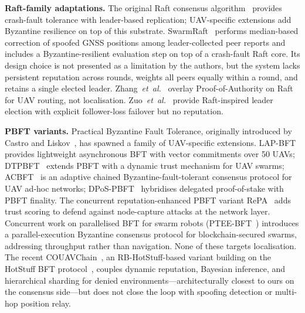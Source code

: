 \documentclass[conference,10pt]{IEEEtran}
\begin{document}
\textbf{Raft-family adaptations.} The original Raft consensus algorithm~\cite{ongaro2014raft} provides crash-fault tolerance with leader-based replication; UAV-specific extensions add Byzantine resilience on top of this substrate. SwarmRaft~\cite{dev2025swarmraft} performs median-based correction of spoofed GNSS positions among leader-collected peer reports and includes a Byzantine-resilient evaluation step on top of a crash-fault Raft core. Its design choice is not presented as a limitation by the authors, but the system lacks persistent reputation across rounds, weights all peers equally within a round, and retains a single elected leader. Zhang~\emph{et~al.}~\cite{zhang2024reputation} overlay Proof-of-Authority on Raft for UAV routing, not localisation. Zuo~\emph{et~al.}~\cite{zuo2022voting} provide Raft-inspired leader election with explicit follower-loss failover but no reputation.

\textbf{PBFT variants.} Practical Byzantine Fault Tolerance, originally introduced by Castro and Liskov~\cite{castro1999pbft}, has spawned a family of UAV-specific extensions. LAP-BFT~\cite{kong2022lapbft} provides lightweight asynchronous BFT with vector commitments over 50 UAVs; DTPBFT~\cite{han2024dtpbft} extends PBFT with a dynamic trust mechanism for UAV swarms; ACBFT~\cite{wang2025acbft} is an adaptive chained Byzantine-fault-tolerant consensus protocol for UAV ad-hoc networks; DPoS-PBFT~\cite{hafeez2024dposbft} hybridises delegated proof-of-stake with PBFT finality. The concurrent reputation-enhanced PBFT variant RePA~\cite{repa2025iot} adds trust scoring to defend against node-capture attacks at the network layer. Concurrent work on parallelised BFT for swarm robots (PTEE-BFT~\cite{wang2025pteebft}) introduces a parallel-execution Byzantine consensus protocol for blockchain-secured swarms, addressing throughput rather than navigation. None of these targets localisation. The recent COUAVChain~\cite{couavchain2025}, an RB-HotStuff-based variant building on the HotStuff BFT protocol~\cite{yin2019hotstuff}, couples dynamic reputation, Bayesian inference, and hierarchical sharding for denied environments---architecturally closest to ours on the consensus side---but does not close the loop with spoofing detection or multi-hop position relay.
\end{document}

